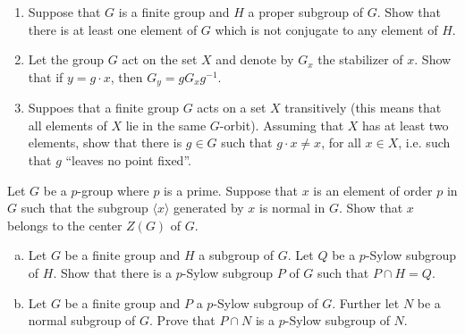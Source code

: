 \documentclass{article}
\newcounter{Problem}
\newenvironment{Problem}{\begin{Exercise}[name={Problem},
                                          counter={Problem}]}
                        {\end{Exercise}}
\begin{document}
\pagebreak
\begin{Problem}
\begin{enumerate}
  \item{Suppose that $G$ is a finite group and $H$ a proper subgroup
      of $G$. Show that there is at least one element of $G$ which is
      not conjugate to any element of $H$.}
  \item{Let the group $G$ act on the set $X$ and denote by $G_x$ the
      stabilizer of $x$. Show that if $y = g \cdot x$, then $G_y = g
      G_x g^{-1}$.}
  \item{Suppoes that a finite group $G$ acts on a set $X$ transitively
      (this means that all elements of $X$ lie in the same
      $G$-orbit). Assuming that $X$ has at least two elements, show
      that there is $g \in G$ such that $g \cdot x \neq x$, for all $x
      \in X$, i.e. such that $g$ ``leaves no point fixed''.}
\end{enumerate}
\end{Problem}

\pagebreak
\begin{Problem}
Let $G$ be a $p$-group where $p$ is a prime. Suppose that $x$ is an
element of order $p$ in $G$ such that the subgroup $\langle x \rangle$
generated by $x$ is normal in $G$. Show that $x$ belongs to the center
$Z(G)$ of $G$.
\end{Problem}

\begin{Answer}
\end{Answer}

\pagebreak
\begin{Problem}
\begin{enumerate}[(a)]
\item{Let $G$ be a finite group and $H$ a subgroup of $G$. Let $Q$ be
    a $p$-Sylow subgroup of $H$. Show that there is a $p$-Sylow
    subgroup $P$ of $G$ such that $P \cap H = Q$.}
\item{Let $G$ be a finite group and $P$ a $p$-Sylow subgroup of
    $G$. Further let $N$ be a normal subgroup of $G$. Prove that $P
    \cap N$ is a $p$-Sylow subgroup of $N$.}
\end{enumerate}
\end{Problem}

\begin{Answer}
\end{Answer}
\end{document}
